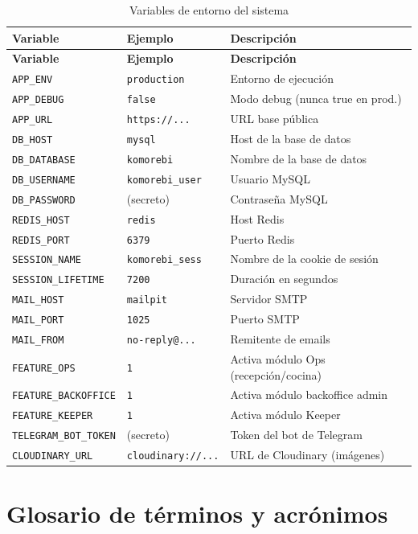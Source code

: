 \documentclass[12pt,a4paper,twoside,openright]{report}
\begin{document}
\begin{appendices}
\begin{longtable}{@{}lp{4cm}p{5cm}@{}}
  \caption{Variables de entorno del sistema}
  \label{tab:envvars}\\
  \toprule
  \textbf{Variable} & \textbf{Ejemplo} & \textbf{Descripción}\\
  \midrule
  \endfirsthead
  \toprule
  \textbf{Variable} & \textbf{Ejemplo} & \textbf{Descripción}\\
  \midrule
  \endhead
  \bottomrule
  \endfoot
  \texttt{APP\_ENV}          & \texttt{production}      & Entorno de ejecución\\
  \texttt{APP\_DEBUG}        & \texttt{false}            & Modo debug (nunca true en prod.)\\
  \texttt{APP\_URL}          & \texttt{https://...}      & URL base pública\\
  \texttt{DB\_HOST}          & \texttt{mysql}            & Host de la base de datos\\
  \texttt{DB\_DATABASE}      & \texttt{komorebi}         & Nombre de la base de datos\\
  \texttt{DB\_USERNAME}      & \texttt{komorebi\_user}   & Usuario MySQL\\
  \texttt{DB\_PASSWORD}      & (secreto)                 & Contraseña MySQL\\
  \texttt{REDIS\_HOST}       & \texttt{redis}            & Host Redis\\
  \texttt{REDIS\_PORT}       & \texttt{6379}             & Puerto Redis\\
  \texttt{SESSION\_NAME}     & \texttt{komorebi\_sess}   & Nombre de la cookie de sesión\\
  \texttt{SESSION\_LIFETIME} & \texttt{7200}             & Duración en segundos\\
  \texttt{MAIL\_HOST}        & \texttt{mailpit}          & Servidor SMTP\\
  \texttt{MAIL\_PORT}        & \texttt{1025}             & Puerto SMTP\\
  \texttt{MAIL\_FROM}        & \texttt{no-reply@...}     & Remitente de emails\\
  \texttt{FEATURE\_OPS}      & \texttt{1}                & Activa módulo Ops (recepción/cocina)\\
  \texttt{FEATURE\_BACKOFFICE}& \texttt{1}               & Activa módulo backoffice admin\\
  \texttt{FEATURE\_KEEPER}   & \texttt{1}                & Activa módulo Keeper\\
  \texttt{TELEGRAM\_BOT\_TOKEN}& (secreto)               & Token del bot de Telegram\\
  \texttt{CLOUDINARY\_URL}   & \texttt{cloudinary://...} & URL de Cloudinary (imágenes)\\
\end{longtable}

\chapter{Glosario de términos y acrónimos}
\label{ap:glosario}

\printunsrtglossary[type=abbreviations,title=Acrónimos]
\printunsrtglossary[type=main,title=Términos]

\end{appendices}
\end{document}
